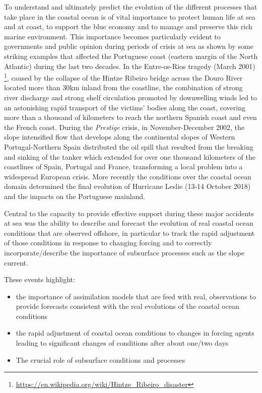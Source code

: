 To understand and ultimately predict the evolution of the different
processes that take place in the coastal ocean is of vital importance
to protect human life at sea and at coast, to support the blue economy
and to manage and preserve this rich marine environment. This
importance becomes particularly evident to governments and public
opinion during periods of crisis at sea as shown by some striking
examples that affected the Portuguese coast (eastern margin of the
North Atlantic) during the last two decades. In the Entre-os-Rios
tragedy (March 2001)
\footnote{\url{https://en.wikipedia.org/wiki/Hintze_Ribeiro_disaster}},
caused by the collapse of the Hintze Ribeiro bridge across the Douro
River located more than 30km inland from the coastline, the
combination of strong river discharge and strong shelf circulation
promoted by downwelling winds led to an astonishing rapid transport of
the victims' bodies along the coast, covering more than a thousand of
kilometers to reach the northern Spanish coast and even the French
coast. During the \emph{Prestige} crisis, in November-December 2002,
the slope intensified flow that develops along the continental slopes
of Western Portugal-Northern Spain distributed the oil spill that
resulted from the breaking and sinking of the tanker which extended
for over one thousand kilometers of the coastlines of Spain, Portugal
and France, transforming a local problem into a widespread European
crisis. More recently the conditions over the coastal ocean domain
determined the final evolution of Hurricane Leslie (13-14 October
2018) and the impacts on the Portuguese mainland.
 
Central to the capacity to provide effective support during these
major accidents at sea was the ability to describe and forecast the
evolution of real coastal ocean conditions that are observed offshore,
in particular to track the rapid adjustment of those conditions in
response to changing forcing and to correctly incorporate/describe the
importance of subsurface processes such as the slope current.
 
These events highlight:

\begin{itemize}
  
\item the importance of assimilation models that are feed with real,
  observations to provide forecasts consistent with the real
  evolutions of the coastal ocean conditions

\item the rapid adjustment of coastal ocean conditions to changes in
  forcing agents leading to significant changes of conditions after
  about one/two days

\item The crucial role of subsurface conditions and processes
 
\end{itemize}

